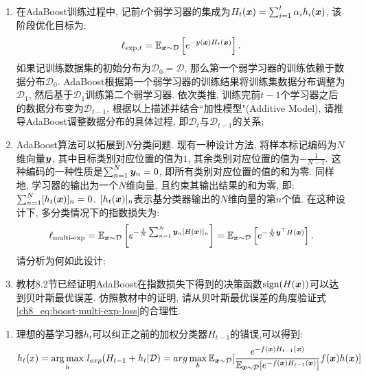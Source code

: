 \documentclass[answers]{exam}  %
\begin{document}
\begin{questions}


	\begin{enumerate}
		\item  在AdaBoost训练过程中, 记前$t$个弱学习器的集成为$H_t({\boldsymbol{x}}) = \sum_{i=1}^t \alpha_i h_i({\boldsymbol{x}})$, 该阶段优化目标为:
		      \begin{equation}
			      \ell_{\text{exp},t} = \mathbb{E}_{{\boldsymbol{x}} \sim \mathcal{D}}\left[ e^{-y({\boldsymbol{x}})H_t({\boldsymbol{x}})} \right]. \label{ch8_eq:boost-exp-loss}
		      \end{equation}
		      如果记训练数据集的初始分布为$\mathcal{D}_0=\mathcal{D}$, 那么第一个弱学习器的训练依赖于数据分布$\mathcal{D}_0$. AdaBoost根据第一个弱学习器的训练结果将训练集数据分布调整为$\mathcal{D}_1$, 然后基于$\mathcal{D}_1$训练第二个弱学习器. 依次类推, 训练完前$t-1$个学习器之后的数据分布变为$\mathcal{D}_{t-1}$. 根据以上描述并结合``加性模型"(Additive Model), 请推导AdaBoost调整数据分布的具体过程, 即$\mathcal{D}_t$与$\mathcal{D}_{t-1}$的关系;
		\item AdaBoost算法可以拓展到$N$分类问题. 现有一种设计方法, 将样本标记编码为$N$维向量$\boldsymbol{y}$, 其中目标类别对应位置的值为$1$, 其余类别对应位置的值为$-\frac{1}{N-1}$. 这种编码的一种性质是$\sum_{n=1}^N \boldsymbol{y}_n = 0$, 即所有类别对应位置的值的和为零. 同样地, 学习器的输出为一个$N$维向量, 且约束其输出结果的和为零, 即: $\sum_{n=1}^N [h_t({\boldsymbol{x}})]_n = 0$. $[h_t({\boldsymbol{x}})]_{n}$表示基分类器输出的$N$维向量的第$n$个值. 在这种设计下, 多分类情况下的指数损失为:
		      \begin{equation}
			      \ell_{\text{multi-exp}} = \mathbb{E}_{{\boldsymbol{x}} \sim \mathcal{D}}\left[  e^{-\frac{1}{N}\sum_{n=1}^N \boldsymbol{y}_n [H({\boldsymbol{x}})]_n} \right] = \mathbb{E}_{{\boldsymbol{x}} \sim \mathcal{D}}\left[  e^{- \frac{1}{N} \boldsymbol{y}^\top H({\boldsymbol{x}})} \right]. \label{ch8_eq:boost-multi-exp-loss}
		      \end{equation}
		      请分析为何如此设计;
		\item 教材8.2节已经证明AdaBoost在指数损失下得到的决策函数$\text{sign}(H({\boldsymbol{x}}))$可以达到贝叶斯最优误差. 仿照教材中的证明, 请从贝叶斯最优误差的角度验证式\eqref{ch8_eq:boost-multi-exp-loss}的合理性.
	\end{enumerate}

	\begin{solution}
		\begin{enumerate}
			\item 理想的基学习器$h_t$可以纠正之前的加权分类器$H_{t-1}$的错误,可以得到:
			      $$
				      h_t(x)=\underset{h}{\mathrm{arg\max}}\ l_{exp}(H_{t-1}+h_t|\mathcal{D})\\=arg \max\limits_{h}\mathbb{E}_{\vx\sim\mathcal{D}}[\frac{e^{-f(\vx)H_{t-1}(\vx)}}{\mathbb{E}_{\vx\sim\mathcal{D}}[e^{-f(\vx)H_{t-1}(\vx)}]}f(\vx)h(\vx) ]
			      $$


\end{enumerate}
\end{solution}
\end{questions}
\end{document}
